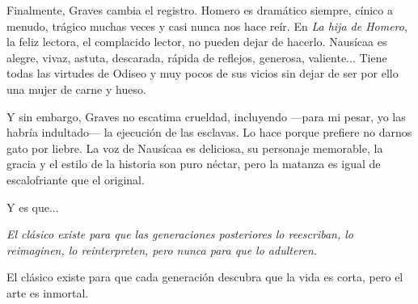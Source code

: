 Finalmente, Graves cambia el registro. Homero es dramático siempre, cínico a menudo, trágico muchas veces y casi nunca nos hace reír. En \emph{La hija de Homero}, la feliz lectora, el complacido lector, no pueden dejar de hacerlo. Nausícaa es alegre, vivaz, astuta, descarada, rápida de reflejos, generosa, valiente... Tiene todas las virtudes de Odiseo y muy pocos de sus vicios sin dejar de ser por ello una mujer de carne y hueso.

Y sin embargo, Graves no escatima crueldad, incluyendo ---para mi pesar, yo las habría indultado--- la ejecución de las esclavas. Lo hace porque prefiere no darnos gato por liebre. La voz de Nausícaa es deliciosa, su personaje memorable, la gracia y el estilo de la historia son puro néctar, pero la matanza es igual de escalofriante que el original.

Y es que...

\emph{El clásico existe para que las generaciones posteriores lo reescriban, lo reimaginen, lo reinterpreten, pero nunca para que lo adulteren.}

El clásico existe para que cada generación descubra que la vida es corta, pero el arte es inmortal.
